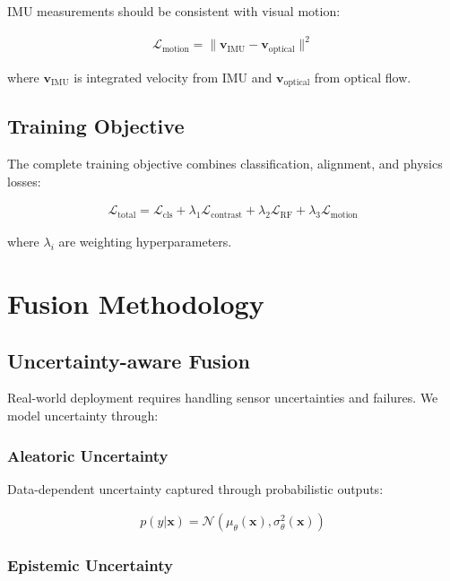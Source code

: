 \documentclass[journal]{IEEEtran}
\begin{document}
IMU measurements should be consistent with visual motion:

\begin{align}
\mathcal{L}_{\text{motion}} = \|\mathbf{v}_{\text{IMU}} - \mathbf{v}_{\text{optical}}\|^2
\end{align}

where $\mathbf{v}_{\text{IMU}}$ is integrated velocity from IMU and $\mathbf{v}_{\text{optical}}$ from optical flow.

\subsection{Training Objective}

The complete training objective combines classification, alignment, and physics losses:

\begin{align}
\mathcal{L}_{\text{total}} = \mathcal{L}_{\text{cls}} + \lambda_1 \mathcal{L}_{\text{contrast}} + \lambda_2 \mathcal{L}_{\text{RF}} + \lambda_3 \mathcal{L}_{\text{motion}}
\end{align}

where $\lambda_i$ are weighting hyperparameters.

\section{Fusion Methodology}

\subsection{Uncertainty-aware Fusion}

Real-world deployment requires handling sensor uncertainties and failures. We model uncertainty through:

\subsubsection{Aleatoric Uncertainty}

Data-dependent uncertainty captured through probabilistic outputs:

\begin{align}
p(y|\mathbf{x}) = \mathcal{N}(\mu_{\theta}(\mathbf{x}), \sigma^2_{\theta}(\mathbf{x}))
\end{align}

\subsubsection{Epistemic Uncertainty}
\end{document}
